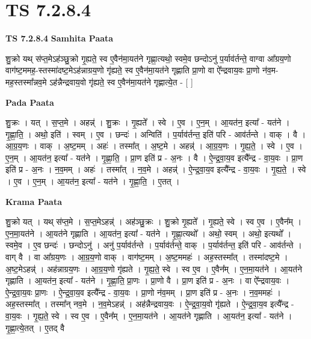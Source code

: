 \documentclass[17pt]{extarticle}
\begin{document}
\section{ TS 7.2.8.4 }

\textbf{TS 7.2.8.4 } \newline
\textbf{Samhita Paata} \newline

शु॒क्रो यथ् स॑प्त॒मेऽह॑ञ्छु॒क्रो गृ॒ह्यते॒ स्व ए॒वैन॑मा॒यत॑ने गृह्णा॒त्यथो॒ स्वमे॒व छन्दोऽनु॑ प॒र्याव॑र्तन्ते॒ वाग्वा आ᳚ग्रय॒णो वाग॑ष्ट॒ममह॒-स्तस्मा॑दष्ट॒मेऽह॑न्नाग्रय॒णो गृ॑ह्यते॒ स्व ए॒वैन॑मा॒यत॑ने गृह्णाति प्रा॒णो वा ऐ᳚न्द्रवाय॒वः प्रा॒णो न॑व॒म-मह॒स्तस्मा᳚न्नव॒मे ऽह॑न्नैन्द्रवाय॒वो गृ॑ह्यते॒ स्व ए॒वैन॑मा॒यत॑ने गृह्णात्ये॒त - [  ] \newline

\textbf{Pada Paata} \newline

शु॒क्रः । यत् । स॒प्त॒मे । अहन्न्॑ । शु॒क्रः । गृ॒ह्यते᳚ । स्वे । ए॒व । ए॒न॒म् । आ॒यत॑न॒ इत्या᳚ - यत॑ने । गृ॒ह्णा॒ति॒ । अथो॒ इति॑ । स्वम् । ए॒व । छन्दः॑ । अन्विति॑ । प॒र्याव॑र्तन्त॒ इति॑ परि - आव॑र्तन्ते । वाक् । वै । आ॒ग्र॒य॒णः । वाक् । अ॒ष्ट॒मम् । अहः॑ । तस्मा᳚त् । अ॒ष्ट॒मे । अहन्न्॑ । आ॒ग्र॒य॒णः । गृ॒ह्य॒ते॒ । स्वे । ए॒व । ए॒न॒म् । आ॒यत॑न॒ इत्या᳚ - यत॑ने । गृ॒ह्णा॒ति॒ । प्रा॒ण इति॑ प्र - अ॒नः । वै । ऐ॒न्द्र॒वा॒य॒व इत्यै᳚न्द्र - वा॒य॒वः । प्रा॒ण इति॑ प्र - अ॒नः । न॒व॒मम् । अहः॑ । तस्मा᳚त् । न॒व॒मे । अहन्न्॑ । ऐ॒न्द्र॒वा॒य॒व इत्यै᳚न्द्र - वा॒य॒वः । गृ॒ह्य॒ते॒ । स्वे । ए॒व । ए॒न॒म् । आ॒यत॑न॒ इत्या᳚ - यत॑ने । गृ॒ह्णा॒ति॒ । ए॒तत् ।  \newline


\textbf{Krama Paata} \newline

शु॒क्रो यत् । यथ् स॑प्त॒मे । स॒प्त॒मेऽहन्न्॑ । अह॑ञ्छु॒क्रः । शु॒क्रो गृ॒ह्यते᳚ । गृ॒ह्यते॒ स्वे । स्व ए॒व । ए॒वैन᳚म् । ए॒न॒मा॒यत॑ने । आ॒यत॑ने गृह्णाति । आ॒यत॑न॒ इत्या᳚ - यत॑ने । गृ॒ह्णा॒त्यथो᳚ । अथो॒ स्वम् । अथो॒ इत्यथो᳚ । स्वमे॒व । ए॒व छन्दः॑ । छन्दोऽनु॑ । अनु॑ प॒र्याव॑र्तन्ते । प॒र्याव॑र्तन्ते॒ वाक् । प॒र्याव॑र्तन्त॒ इति॑ परि - आव॑र्तन्ते । वाग् वै । वा आ᳚ग्रय॒णः । आ॒ग्र॒य॒णो वाक् । वाग॑ष्ट॒मम् । अ॒ष्ट॒ममहः॑ । अह॒स्तस्मा᳚त् । तस्मा॑दष्ट॒मे । अ॒ष्ट॒मेऽहन्न्॑ । अह॑न्नाग्रय॒णः । आ॒ग्र॒य॒णो गृ॑ह्यते । गृ॒ह्य॒ते॒ स्वे । स्व ए॒व । ए॒वैन᳚म् । ए॒न॒मा॒यत॑ने । आ॒यत॑ने गृह्णाति । आ॒यत॑न॒ इत्या᳚ - यत॑ने । गृ॒ह्णा॒ति॒ प्रा॒णः । प्रा॒णो वै । प्रा॒ण इति॑ प्र - अ॒नः । वा ऐ᳚न्द्रवाय॒वः । ऐ॒न्द्र॒वा॒य॒वः प्रा॒णः । ऐ॒न्द्र॒वा॒य॒व इत्यै᳚न्द्र - वा॒य॒वः । प्रा॒णो न॑व॒मम् । प्रा॒ण इति॑ प्र - अ॒नः । न॒व॒ममहः॑ । अह॒स्तस्मा᳚त् । तस्मा᳚न् नव॒मे । न॒व॒मेऽहन्न्॑ । अह॑न्नैन्द्रवाय॒वः । ऐ॒न्द्र॒वा॒य॒वो गृ॑ह्यते । ऐ॒न्द्र॒वा॒य॒व इत्यै᳚न्द्र - वा॒य॒वः । गृ॒ह्य॒ते॒ स्वे । स्व ए॒व । ए॒वैन᳚म् । ए॒न॒मा॒यत॑ने । आ॒यत॑ने गृह्णाति । आ॒यत॑न॒ इत्या᳚ - यत॑ने । गृ॒ह्णा॒त्ये॒तत् । ए॒तद् वै \newline
\end{document}
